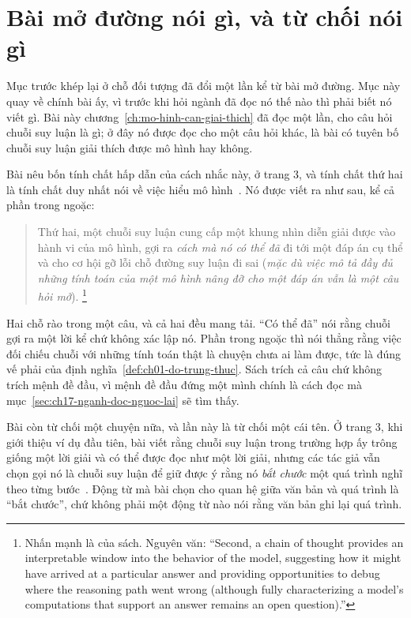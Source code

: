 \section{Bài mở đường nói gì, và từ chối nói gì}
\label{sec:ch17-bai-mo-duong}

%
Mục trước khép lại ở chỗ đối tượng đã đổi một lần kể từ bài mở đường. Mục này
quay về chính bài ấy, vì trước khi hỏi ngành đã đọc nó thế nào thì phải biết nó
viết gì. Bài này chương~\ref{ch:mo-hinh-can-giai-thich} đã đọc một lần, cho câu
hỏi chuỗi suy luận là gì; ở đây nó được đọc cho một câu hỏi khác, là bài có
tuyên bố chuỗi suy luận giải thích được mô hình hay không.

%
Bài nêu bốn tính chất hấp dẫn của cách nhắc này, ở trang 3, và tính chất thứ hai
là tính chất duy nhất nói về việc hiểu mô hình~\autocite{p06cot}. Nó được viết ra
như sau, kể cả phần trong ngoặc:

\begin{quote}
Thứ hai, một chuỗi suy luận cung cấp một khung nhìn diễn giải được vào hành vi
của mô hình, gợi ra \emph{cách mà nó có thể đã} đi tới một đáp án cụ thể và cho
cơ hội gỡ lỗi chỗ đường suy luận đi sai (\emph{mặc dù việc mô tả đầy đủ những
tính toán của một mô hình nâng đỡ cho một đáp án vẫn là một câu hỏi mở}).%
\footnote{Nhấn mạnh là của sách. Nguyên văn: \enquote{Second, a chain of thought
provides an interpretable window into the behavior of the model, suggesting how
it might have arrived at a particular answer and providing opportunities to debug
where the reasoning path went wrong (although fully characterizing a model's
computations that support an answer remains an open question).}}
\end{quote}

Hai chỗ rào trong một câu, và cả hai đều mang tải. \enquote{Có thể đã} nói rằng
chuỗi gợi ra một lời kể chứ không xác lập nó. Phần trong ngoặc thì nói thẳng
rằng việc đối chiếu chuỗi với những tính toán thật là chuyện chưa ai làm được,
tức là đúng vế phải của định nghĩa~\ref{def:ch01-do-trung-thuc}. Sách trích cả
câu chứ không trích mệnh đề đầu, vì mệnh đề đầu đứng một mình chính là cách đọc
mà mục~\ref{sec:ch17-nganh-doc-nguoc-lai} sẽ tìm thấy.

%
Bài còn từ chối một chuyện nữa, và lần này là từ chối một cái tên. Ở trang 3, khi
giới thiệu ví dụ đầu tiên, bài viết rằng chuỗi suy luận trong trường hợp ấy trông
giống một lời giải và có thể được đọc như một lời giải, nhưng các tác giả vẫn
chọn gọi nó là chuỗi suy luận để giữ được ý rằng nó \emph{bắt chước} một quá
trình nghĩ theo từng bước~\autocite{p06cot}. Động từ mà bài chọn cho quan hệ giữa
văn bản và quá trình là \enquote{bắt chước}, chứ không phải một động từ nào nói
rằng văn bản ghi lại quá trình.

